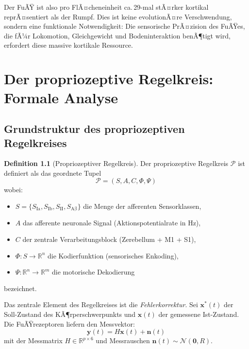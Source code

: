 ﻿\documentclass[12pt,a4paper]{report}
\theoremstyle{plain}
\theoremstyle{definition}
\newtheorem{definition}[theorem]{Definition}
\theoremstyle{remark}
\begin{document}
Der FuÃŸ ist also pro FlÃ¤cheneinheit ca.\,29-mal stÃ¤rker kortikal reprÃ¤sentiert
als der Rumpf. Dies ist keine evolutionÃ¤re Verschwendung, sondern eine
funktionale Notwendigkeit: Die sensorische PrÃ¤zision des FuÃŸes, die fÃ¼r
Lokomotion, Gleichgewicht und Bodeninteraktion benÃ¶tigt wird, erfordert
diese massive kortikale Ressource.

\chapter{Der propriozeptive Regelkreis: Formale Analyse}

\section{Grundstruktur des propriozeptiven Regelkreises}

\begin{definition}[Propriozeptiver Regelkreis]
Der propriozeptive Regelkreis $\mathcal{P}$ ist definiert als das geordnete
Tupel
\[
  \mathcal{P} = (S, A, C, \Phi, \Psi)
\]
wobei:
\begin{itemize}
\item $S = \{S_{\mathrm{Ia}}, S_{\mathrm{Ib}}, S_{\mathrm{II}}, S_{\mathrm{A\beta}}\}$
  die Menge der afferenten Sensorklassen,
\item $A$ das afferente neuronale Signal (Aktionspotentialrate in Hz),
\item $C$ der zentrale Verarbeitungsblock (Zerebellum + M1 + S1),
\item $\Phi: S \to \mathbb{R}^n$ die Kodierfunktion (sensorisches Enkoding),
\item $\Psi: \mathbb{R}^n \to \mathbb{R}^m$ die motorische Dekodierung
\end{itemize}
bezeichnet.
\end{definition}

Das zentrale Element des Regelkreises ist die \emph{Fehlerkorrektur}.
Sei $\mathbf{x}^*(t)$ der Soll-Zustand des KÃ¶rperschwerpunkts und
$\mathbf{x}(t)$ der gemessene Ist-Zustand. Die FuÃŸrezeptoren liefern
den Messvektor:
\[
  \mathbf{y}(t) = H \mathbf{x}(t) + \mathbf{n}(t)
\]
mit der Messmatrix $H \in \mathbb{R}^{p \times 6}$ und Messrauschen
$\mathbf{n}(t) \sim \mathcal{N}(\mathbf{0}, R)$.
\end{document}
